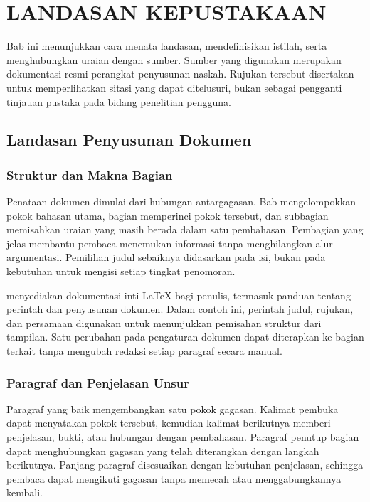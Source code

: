 \chapter{LANDASAN KEPUSTAKAAN}
\label{bab:landasan}

Bab ini menunjukkan cara menata landasan, mendefinisikan istilah, serta menghubungkan uraian dengan sumber. Sumber yang digunakan merupakan dokumentasi resmi perangkat penyusunan naskah. Rujukan tersebut disertakan untuk memperlihatkan sitasi yang dapat ditelusuri, bukan sebagai pengganti tinjauan pustaka pada bidang penelitian pengguna.

\section{Landasan Penyusunan Dokumen}

\subsection{Struktur dan Makna Bagian}

Penataan dokumen dimulai dari hubungan antargagasan. Bab mengelompokkan pokok bahasan utama, bagian memperinci pokok tersebut, dan subbagian memisahkan uraian yang masih berada dalam satu pembahasan. Pembagian yang jelas membantu pembaca menemukan informasi tanpa menghilangkan alur argumentasi. Pemilihan judul sebaiknya didasarkan pada isi, bukan pada kebutuhan untuk mengisi setiap tingkat penomoran.

\textcite{latexproject-documentation} menyediakan dokumentasi inti \LaTeX{} bagi penulis, termasuk panduan tentang perintah dan penyusunan dokumen. Dalam contoh ini, perintah judul, rujukan, dan persamaan digunakan untuk menunjukkan pemisahan struktur dari tampilan. Satu perubahan pada pengaturan dokumen dapat diterapkan ke bagian terkait tanpa mengubah redaksi setiap paragraf secara manual.

\subsection{Paragraf dan Penjelasan Unsur}

Paragraf yang baik mengembangkan satu pokok gagasan. Kalimat pembuka dapat menyatakan pokok tersebut, kemudian kalimat berikutnya memberi penjelasan, bukti, atau hubungan dengan pembahasan. Paragraf penutup bagian dapat menghubungkan gagasan yang telah diterangkan dengan langkah berikutnya. Panjang paragraf disesuaikan dengan kebutuhan penjelasan, sehingga pembaca dapat mengikuti gagasan tanpa memecah atau menggabungkannya kembali.

